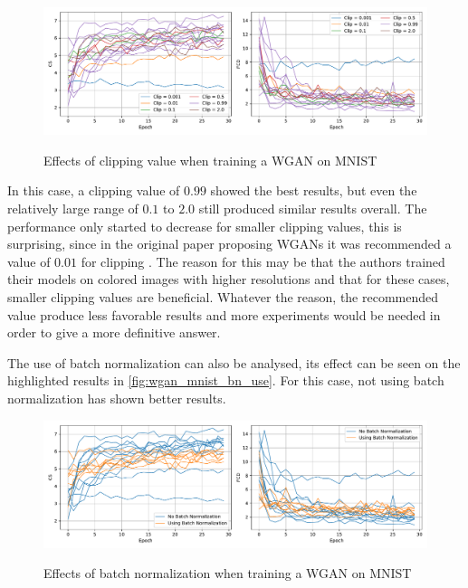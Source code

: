 \begin{figure}[hbt]
    \centering
    \caption{Effects of clipping value when training a WGAN on MNIST}
    \includegraphics[width=\textwidth]{chapters/Experiments/WGAN/mnist_clipping.pdf}
    \label{fig:wgan_mnist_clip}
\end{figure}

In this case, a clipping value of $0.99$ showed the best results, but even the relatively large range of $0.1$ to $2.0$ still produced similar results overall. The performance only started to decrease for smaller clipping values, this is surprising, since in the original paper proposing \acp{WGAN} it was recommended a value of $0.01$ for clipping \cite{wasserstein2017}. The reason for this may be that the authors trained their models on colored images with higher resolutions and that for these cases, smaller clipping values are beneficial. Whatever the reason, the recommended value produce less favorable results and more experiments would be needed in order to give a more definitive answer.

The use of batch normalization can also be analysed, its effect can be seen on the highlighted results in \autoref{fig:wgan_mnist_bn_use}. For this case, not using batch normalization has shown better results. 
\begin{figure}[hbt]
    \centering
    \caption{Effects of batch normalization when training a WGAN on MNIST}
    \includegraphics[width=\textwidth]{chapters/Experiments/WGAN/mnist_bn_use.pdf}
    \label{fig:wgan_mnist_bn_use}
\end{figure}

